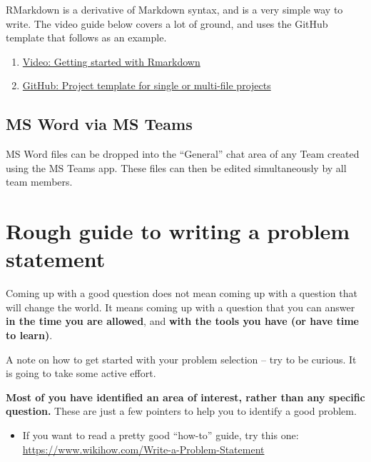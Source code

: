 \documentclass[
]{book}
\providecommand{\tightlist}{%
  \setlength{\itemsep}{0pt}\setlength{\parskip}{0pt}}
\begin{document}
RMarkdown is a derivative of Markdown syntax, and is a very simple way to write. The video guide below covers a lot of ground, and uses the GitHub template that follows as an example.

\begin{enumerate}
\def\labelenumi{\arabic{enumi}.}
\item
  \href{https://www.loom.com/share/407ae8d0f00e4a05941a9a09e5e13f96}{Video: Getting started with Rmarkdown}
\item
  \href{https://github.com/robabsmith/Rmarkdown-project-template}{GitHub: Project template for single or multi-file projects}
\end{enumerate}

\hypertarget{ms-word-via-ms-teams}{%
\section{MS Word via MS Teams}\label{ms-word-via-ms-teams}}

MS Word files can be dropped into the ``General'' chat area of any Team created using the MS Teams app. These files can then be edited simultaneously by all team members.

\hypertarget{rough-guide-to-writing-a-problem-statement}{%
\chapter{Rough guide to writing a problem statement}\label{rough-guide-to-writing-a-problem-statement}}

Coming up with a good question does not mean coming up with a question
that will change the world. It means coming up with a question that you
can answer \textbf{in the time you are allowed}, and \textbf{with the tools you
have (or have time to learn)}.

A note on how to get started with your problem selection -- try to be
curious. It is going to take some active effort.

\textbf{Most of you have identified an area of interest, rather than any
specific question.} These are just a few pointers to help you to
identify a good problem.

\begin{itemize}
\tightlist
\item
  If you want to read a pretty good ``how-to'' guide, try this one:
  \url{https://www.wikihow.com/Write-a-Problem-Statement}
\end{itemize}
\end{document}
